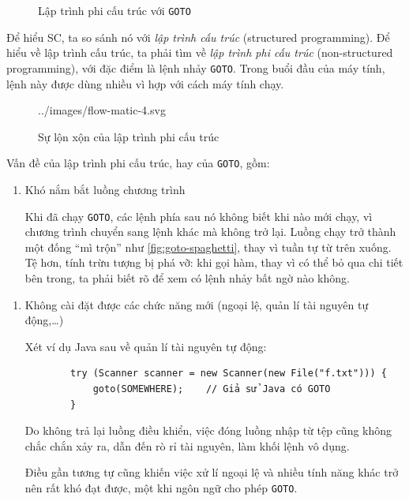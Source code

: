 \documentclass[../../thesis]{subfiles}
\begin{document}
\begin{figure}
    \centering
    \vspace*{-6mm}
    
    \vspace*{-10mm}    %
    \caption{Lập trình phi cấu trúc với \texttt{GOTO} \cite{NJS_SC}}
    \label{fig:non-structured-programming}
\end{figure}

Để hiểu SC, ta so sánh nó với \emph{lập trình cấu trúc} (structured
programming). Để hiểu về lập trình cấu trúc, ta phải tìm về \emph{lập trình phi
cấu trúc} (non-structured programming), với đặc điểm là lệnh nhảy \texttt{GOTO}.
Trong buổi đầu của máy tính, lệnh này được dùng nhiều vì hợp với cách máy tính
chạy.

\begin{figure}
    \centering
    
        {../images/flow-matic-4.svg}
    \caption{Sự lộn xộn của lập trình phi cấu trúc \cite{NJS_SC}}
    \label{fig:goto-spaghetti}
\end{figure}

Vấn đề của lập trình phi cấu trúc, hay của \texttt{GOTO}, gồm:

\begin{enumerate}
    \item
        Khó nắm bắt luồng chương trình

        Khi đã chạy \texttt{GOTO}, các lệnh phía sau nó không biết khi nào mới
        chạy, vì chương trình chuyển sang lệnh khác mà không trở lại. Luồng chạy
        trở thành một đống ``mì trộn'' như \autoref{fig:goto-spaghetti}, thay vì
        tuần tự từ trên xuống. Tệ hơn, tính trừu tượng bị phá vỡ: khi gọi hàm,
        thay vì có thể bỏ qua chi tiết bên trong, ta phải biết rõ để xem có lệnh
        nhảy bất ngờ nào không.
\end{enumerate}

\begin{enumerate}[resume, before = \vspace*{-\dimexpr\topsep+\partopsep\relax}]
    \item
        Không cài đặt được các chức năng mới (ngoại lệ, quản lí tài nguyên tự
        động,\ldots)

        Xét ví dụ Java sau về quản lí tài nguyên tự động:

        \begin{verbatim}
        try (Scanner scanner = new Scanner(new File("f.txt"))) {
            goto(SOMEWHERE);    // Giả sử Java có GOTO
        }
        \end{verbatim}

        Do không trả lại luồng điều khiển, việc đóng luồng nhập từ tệp cũng
        không chắc chắn xảy ra, dẫn đến rò rỉ tài nguyên, làm khối lệnh vô dụng.

        Điều gần tương tự cũng khiến việc xử lí ngoại lệ và nhiều tính năng khác
        trở nên rất khó đạt được, một khi ngôn ngữ cho phép \texttt{GOTO}.
\end{enumerate}
\end{document}
